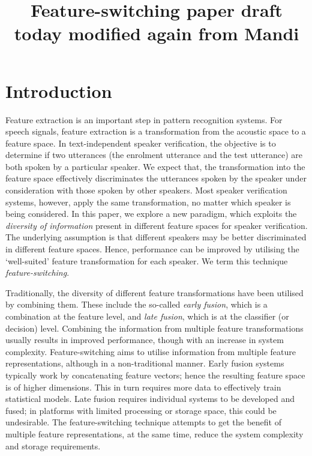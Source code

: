 \documentclass{article}
\title{Feature-switching paper draft today modified again from Mandi}
\begin{document}
\section{Introduction}
\label{sec:intro}
Feature extraction is an important step in pattern recognition systems. For
speech signals, feature extraction is a transformation from the acoustic space
to a feature space. In text-independent speaker verification, the objective is
to determine if two utterances (the enrolment utterance and the test utterance) are
both spoken by a particular speaker. We expect that, the transformation into the
feature space effectively discriminates the utterances spoken by the speaker
under consideration with those spoken by other speakers. Most speaker
verification systems, however, apply the same transformation, no matter which
speaker is being considered. In this paper, we explore a new paradigm, which
exploits the \emph{diversity of information} present in different feature spaces
for speaker verification. The underlying assumption is that different speakers
may be better discriminated in different feature spaces. Hence, performance can
be improved by utilising the `well-suited' feature transformation for
each speaker. We term this technique \emph{feature-switching}. 

Traditionally, the diversity of different feature transformations have been
utilised by combining them. These include the so-called \emph{early fusion},
which is a combination at the feature level, and \emph{late fusion}, which is at
the classifier (or decision) level. Combining the information from multiple
feature transformations usually results in improved performance, though
with an increase in system complexity. Feature-switching aims to utilise
information from multiple feature representations, although in a non-traditional
manner. Early fusion systems typically work by concatenating feature vectors;
hence the resulting feature space is of higher dimensions. This in turn requires
more data to effectively train statistical models. Late fusion requires
individual systems to be developed and fused; in platforms with limited
processing or storage space, this could be undesirable. The feature-switching technique
attempts to get the benefit of multiple feature representations, at the same
time, reduce the system complexity and storage requirements.
\end{document}
